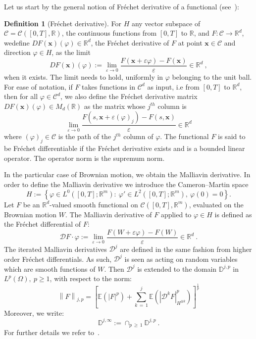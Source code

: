 \documentclass[11pt]{article}
\theoremstyle{definition}
\newtheorem{defi}[theo]{Definition}
\numberwithin{equation}{section}
\numberwithin{figure}{section}
\numberwithin{table}{section}
\newcommand*\ve{\varepsilon}
\newcommand*\R{\mathbb{R}}
\newcommand*\D{\mathbb{D}}
\newcommand*\E{\mathbb{E}}
\newcommand*\Cc{\mathcal{C}}
\newcommand*\Dc{\mathcal{D}}
\newcommand*\xb{\mathbf{x}}
\begin{document}
Let us start by the general notion of Fréchet derivative of a functional (see~\cite[p.~128]{kriegl-michor1997}):
\begin{defi}[Fréchet derivative]\label{frechet-derivative}
For $H$ any vector subspace of $\Cc= \Cc\left([0,T], \R \right)$, the continuous functions from $[0,T]$ to $\R$, and $F: \Cc \to \R^d$, we\linebreak define $DF(\xb)(\varphi)\in\R^d$, the Fréchet derivative of $F$ at point $\xb \in \Cc$ and direction $\varphi\in H$, as the limit
\begin{equation}
DF(\xb)(\varphi):=\lim_{\varepsilon \to 0 }\frac{F(\xb+\varepsilon \varphi)-F(\xb)}{\varepsilon}\in\R^d \ ,
\end{equation} 
when it exists. The limit needs to hold, uniformly in $\varphi$ belonging to the unit ball. For ease of notation, if $F$ takes functions in $\Cc^d$ as input, i.e from $[0,T]$ to $\R^d$, then for all $\varphi \in \Cc^d$, we also define the Fréchet derivative matrix $DF(\xb)(\varphi) \in M_d(\R)$ as the matrix whose $j^{th}$ column is
\[
\lim_{\varepsilon\to 0 }\frac{F(s,\xb+\varepsilon(\varphi)_j)-F(s,\xb)}{\varepsilon} \in \R^d
\]
where $(\varphi)_j\in \Cc$ is the path of the $j^{th}$ column of $\varphi$. The functional $F$ is said to be Fréchet differentiable if the Fréchet derivative exists and is a bounded linear operator. The operator norm is the supremum norm.
\end{defi}

In the particular case of Brownian motion, we obtain the Malliavin derivative. In order to define the Malliavin derivative we introduce the Cameron--Martin space
\[
H:=\left\{ \varphi \in L^0([0,T]; \R^m): \ \varphi' \in L^2([0,T]; \R^m), \ \varphi(0) = 0 \right\}.
\]
Let $F$ be an $\R^d$-valued smooth functional on $\Cc\left([0,T], \R^m \right)$, evaluated on the Brownian motion $W$. The Malliavin derivative of $F$ applied to $\varphi \in H$ is defined as the Fréchet differential of $F$:
\[
\Dc F \cdot \varphi := \lim_{\ve\to 0}\frac{F(W+\ve \varphi)-F(W)}{\ve} \in \R^d \ .
\]
The iterated Malliavin derivatives $\Dc^j$ are defined in the same fashion from higher order Fréchet differentials. As such, $\Dc^j$ is seen as acting on random variables which are smooth functions of $W$. Then $\Dc^j$ is extended to the domain $\D^{j,p}$ in $L^p(\Omega), \ p \geq 1$, with respect to the norm:
\[
\left\| F \right\|_{j,p} = \left[\E \left(|F|^p\right) + \sum_{k\,=\,1}^j \E\left(\left| \Dc^k F \right|^p_{H^{\otimes k}} \right)\right]^{\frac{1}{p}}
\]
Moreover, we write:
\[
\D^{j, \infty} := \cap_{p\,\geq\,1} \D^{j, p} \ .
\]
For further details we refer to~\cite[Section~1.2]{Nualart2006}.
\end{document}
